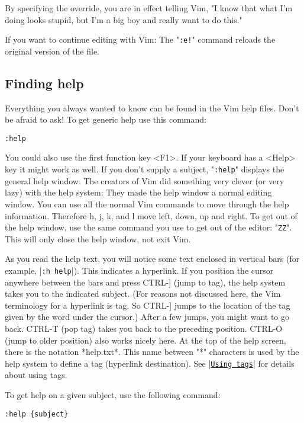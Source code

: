 By specifying the override, you are in effect telling Vim, "I know that what I'm doing looks stupid, but I'm a big boy and really want to do this."

If you want to continue editing with Vim: The "\texttt{:e!}" command reloads the original version of the file.

\subsection{Finding help}

Everything you always wanted to know can be found in the Vim help files.
Don't be afraid to ask!
To get generic help use this command:

 \begin{Verbatim}[samepage=true]
 :help
 \end{Verbatim}

You could also use the first function key <F1>.
If your keyboard has a <Help> key it might work as well.
If you don't supply a subject, "\texttt{:help}" displays the general help window.
The creators of Vim did something very clever (or very lazy) with the help system: They made the help window a normal editing window.
You can use all the normal Vim commands to move through the help information.
Therefore h, j, k, and l move left, down, up and right.
To get out of the help window, use the same command you use to get out of the editor: "\texttt{ZZ}".
This will only close the help window, not exit Vim.

As you read the help text, you will notice some text enclosed in vertical bars (for example, |\texttt{:h help}|).
This indicates a hyperlink.
If you position the cursor anywhere between the bars and press CTRL-] (jump to tag), the help system takes you to the indicated subject.
(For reasons not discussed here, the Vim terminology for a hyperlink is tag.
So CTRL-] jumps to the location of the tag given by the word under the cursor.) After a few jumps, you might want to go back.
CTRL-T (pop tag) takes you back to the preceding position.
CTRL-O (jump to older position) also works nicely here.
At the top of the help screen, there is the notation *help.txt*.
This name between "*" characters is used by the help system to define a tag (hyperlink destination).
See |\hyperref[Using tags]{\texttt{Using tags}}| for details about using tags.

To get help on a given subject, use the following command:

 \begin{Verbatim}[samepage=true]
 :help {subject}
 \end{Verbatim}

